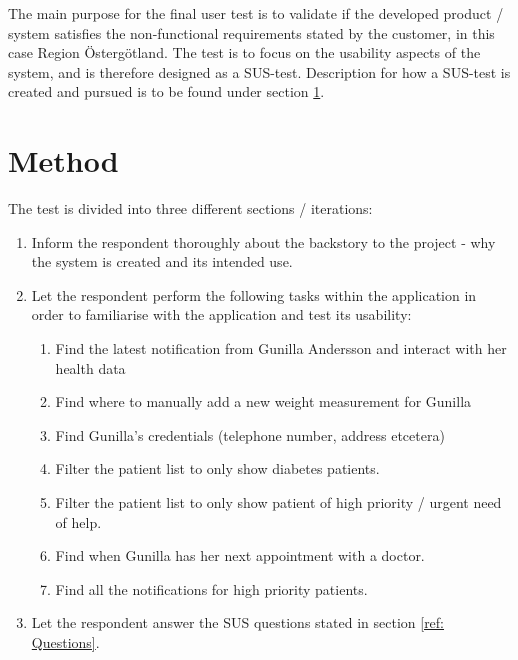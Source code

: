 \documentclass[12pt]{article}
\begin{document}
    The main purpose for the final user test is to validate if the developed product / system satisfies the non-functional requirements stated by the customer, in this case Region Östergötland. The test is to focus on the usability aspects of the system, and is therefore designed as a SUS-test. Description for how a SUS-test is created and pursued is to be found under section \ref{sec: Method}. 


    
    \section{Method}
    \label{sec: Method}
    The test is divided into three different sections / iterations:
    
    \begin{enumerate}
        \item Inform the respondent thoroughly about the backstory to the project - why the system is created and its intended use. 
        \item Let the respondent perform the following tasks within the application in order to familiarise with the application and test its usability:
        \begin{enumerate}
            \item Find the latest notification from Gunilla Andersson and interact with her health data
            \item Find where to manually add a new weight measurement for Gunilla
            \item Find Gunilla's credentials (telephone number, address etcetera)
            \item Filter the patient list to only show diabetes patients.
            \item Filter the patient list to only show patient of high priority / urgent need of help.
            \item Find when Gunilla has her next appointment with a doctor.
            \item Find all the notifications for high priority patients.
        \end{enumerate}
        \item Let the respondent answer the SUS questions stated in section \ref{ref: Questions}.
    \end{enumerate}
\end{document}
